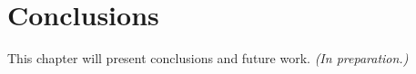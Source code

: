 \section{Conclusions}
This chapter will present conclusions and future work. \emph{(In preparation.)}

